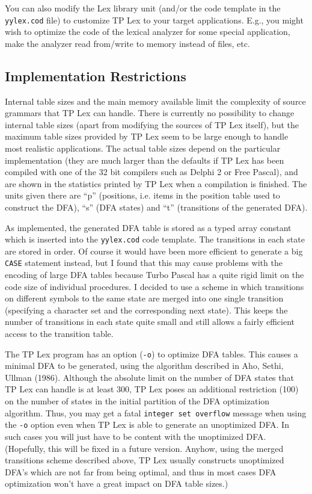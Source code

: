 You can also modify the Lex library unit (and/or the code template in the
\verb"yylex.cod" file) to customize TP Lex to your target applications. E.g.,
you might wish to optimize the code of the lexical analyzer for some
special application, make the analyzer read from/write to memory instead
of files, etc.

\subsection{Implementation Restrictions}

Internal table sizes and the main memory available limit the complexity of
source grammars that TP Lex can handle. There is currently no possibility to
change internal table sizes (apart from modifying the sources of TP Lex
itself), but the maximum table sizes provided by TP Lex seem to be large
enough to handle most realistic applications. The actual table sizes depend on
the particular implementation (they are much larger than the defaults if TP
Lex has been compiled with one of the 32 bit compilers such as Delphi 2 or
Free Pascal), and are shown in the statistics printed by TP Lex when a
compilation is finished. The units given there are ``p'' (positions, i.e.
items in the position table used to construct the DFA), ``s'' (DFA states) and
``t'' (transitions of the generated DFA).

As implemented, the generated DFA table is stored as a typed array constant
which is inserted into the \verb"yylex.cod" code template. The transitions in
each state are stored in order. Of course it would have been more efficient to
generate a big \verb"CASE" statement instead, but I found that this may cause
problems with the encoding of large DFA tables because Turbo Pascal has
a quite rigid limit on the code size of individual procedures. I decided to
use a scheme in which transitions on different symbols to the same state are
merged into one single transition (specifying a character set and the
corresponding next state). This keeps the number of transitions in each state
quite small and still allows a fairly efficient access to the transition
table.

The TP Lex program has an option (\verb"-o") to optimize DFA tables. This
causes a minimal DFA to be generated, using the algorithm described in Aho,
Sethi, Ullman (1986). Although the absolute limit on the number of DFA states
that TP Lex can handle is at least 300, TP Lex poses an additional restriction
(100) on the number of states in the initial partition of the DFA optimization
algorithm. Thus, you may get a fatal \verb"integer set overflow" message when
using the \verb"-o" option even when TP Lex is able to generate an unoptimized
DFA. In such cases you will just have to be content with the unoptimized DFA.
(Hopefully, this will be fixed in a future version. Anyhow, using the merged
transitions scheme described above, TP Lex usually constructs unoptimized
DFA's which are not far from being optimal, and thus in most cases DFA
optimization won't have a great impact on DFA table sizes.)

